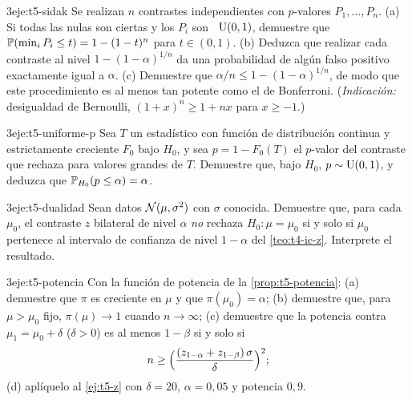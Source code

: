 \begin{ejercicio}{3}{eje:t5-sidak}
Se realizan $n$ contrastes independientes con $p$-valores $P_1,\dots,P_n$. (a) Si todas las nulas son ciertas y los $P_i$ son \iid\ $\operatorname{U}(0,1)$, demuestre que $\mathbb{P}(\min_iP_i\le t)=1-(1-t)^{n}$ para $t\in(0,1)$. (b) Deduzca que realizar cada contraste al nivel $1-(1-\alpha)^{1/n}$ da una probabilidad de algún falso positivo exactamente igual a $\alpha$. (c) Demuestre que $\alpha/n\le1-(1-\alpha)^{1/n}$, de modo que este procedimiento es al menos tan potente como el de Bonferroni. (\emph{Indicación:} desigualdad de Bernoulli, $(1+x)^{n}\ge1+nx$ para $x\ge-1$.)
\end{ejercicio}

\begin{ejercicio}{3}{eje:t5-uniforme-p}
Sea $T$ un estadístico con función de distribución continua y estrictamente creciente $F_0$ bajo $H_0$, y sea $p=1-F_0(T)$ el $p$-valor del contraste que rechaza para valores grandes de $T$. Demuestre que, bajo $H_0$, $p\sim\operatorname{U}(0,1)$, y deduzca que $\mathbb{P}_{H_0}(p\le\alpha)=\alpha$.
\end{ejercicio}

\begin{ejercicio}{3}{eje:t5-dualidad}
Sean datos $\mathcal{N}(\mu,\sigma^{2})$ con $\sigma$ conocida. Demuestre que, para cada $\mu_0$, el contraste $z$ bilateral de nivel $\alpha$ \emph{no} rechaza $H_0:\mu=\mu_0$ si y solo si $\mu_0$ pertenece al intervalo de confianza de nivel $1-\alpha$ del \cref{teo:t4-ic-z}. Interprete el resultado.
\end{ejercicio}

\begin{ejercicio}{3}{eje:t5-potencia}
Con la función de potencia de la \cref{prop:t5-potencia}: (a) demuestre que $\pi$ es creciente en $\mu$ y que $\pi(\mu_0)=\alpha$; (b) demuestre que, para $\mu>\mu_0$ fijo, $\pi(\mu)\to1$ cuando $n\to\infty$; (c) demuestre que la potencia contra $\mu_1=\mu_0+\delta$ ($\delta>0$) es al menos $1-\beta$ si y solo si
\[
n\ge\Bigl(\frac{(z_{1-\alpha}+z_{1-\beta})\,\sigma}{\delta}\Bigr)^{2};
\]
(d) aplíquelo al \cref{ej:t5-z} con $\delta=20$, $\alpha=0{,}05$ y potencia $0{,}9$.
\end{ejercicio}
